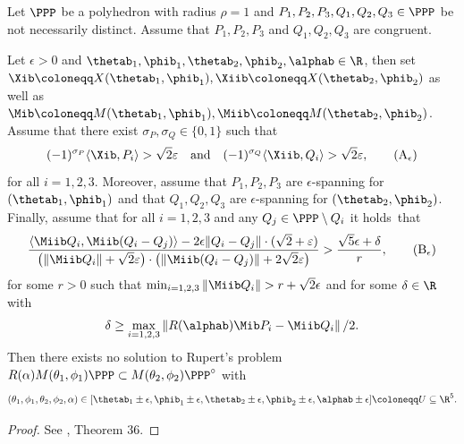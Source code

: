 \begin{theorem} \label{thm:local}
\leanok
{}
    Let $\PPP$ be a polyhedron with radius $\rho=1$ and $P_1, P_2, P_3, Q_1, Q_2, Q_3 \in \PPP$ be not necessarily distinct. Assume that $P_1, P_2, P_3$ and $Q_1, Q_2, Q_3$ are congruent.

    Let $\epsilon>0$ and $\thetab_1,\phib_1,\thetab_2,\phib_2,\alphab \in \R$, then set $\Xib \coloneqq X(\thetab_1,\phib_1), \Xiib \coloneqq X(\thetab_2,\phib_2)$ as well as $\Mib \coloneqq M(\thetab_1,\phib_1), \Miib \coloneqq M(\thetab_2,\phib_2)$.
    Assume that there exist $\sigma_P, \sigma_Q \in \{0,1\}$ such that
    \[
        (-1)^{\sigma_P} \langle \Xib,P_i\rangle>\sqrt{2}\varepsilon \quad \text{and} \quad
        (-1)^{\sigma_Q} \langle \Xiib , Q_i\rangle>\sqrt{2}\varepsilon, \tag{A$_\epsilon$}
    \]
    for all $i=1,2,3$.
    Moreover, assume that $P_1,P_2,P_3$ are $\epsilon$-spanning for $(\thetab_1,\phib_1)$ and that $Q_1,Q_2,Q_3$ are $\epsilon$-spanning for $(\thetab_2,\phib_2)$.
    Finally, assume that for all $i = 1,2,3$ and any $Q_j \in \PPP \setminus Q_i$ it holds~that
    \[
        \frac{\langle \Miib Q_i,\Miib (Q_i-Q_j)\rangle - 2 \epsilon \|Q_i-Q_j\| \cdot  (\sqrt{2}+\varepsilon)}{ \big(\|\Miib Q_i\|+\sqrt{2} \varepsilon \big) \cdot \big(\|\Miib(Q_i-Q_j)\|+2 \sqrt{2} \varepsilon\big)} > \frac{\sqrt{5} \epsilon + \delta}{r}, \tag{B$_\epsilon$}
    \]
    for some $r >0$ such that $\min_{i=1,2,3}\| \Miib Q_i \| > r + \sqrt{2} \epsilon$ and for some $\delta \in \R$ with
    \[
        \delta \geq \max_{i=1,2,3}\left\|R(\alphab) \Mib P_i - \Miib Q_i\right\|/2.
    \]
    Then there exists no solution to Rupert's problem $R(\alpha) M(\theta_1,\phi_1)\PPP \subset  M(\theta_2,\phi_2)\PPP^\circ$ with
    \[
        (\theta_1, \phi_1, \theta_2, \phi_2, \alpha) \in [\thetab_1\pm\epsilon,\phib_1\pm\epsilon,\thetab_2\pm\epsilon,\phib_2\pm\epsilon,\alphab\pm\epsilon] \coloneqq U \subseteq \R^5.
    \]
\end{theorem}

\begin{proof}\leanok
{}
See \cite{polyhedron.without.rupert}, Theorem 36.
\end{proof}
